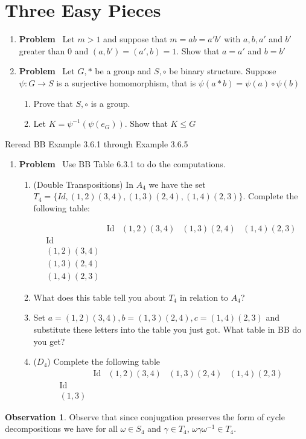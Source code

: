 \documentclass[12pt]{amsart}
\newcommand{\benu}{\begin{enumerate}}
\newcommand{\eenu}{\end{enumerate}}
\theoremstyle{definition}
\newtheorem{observation}[theorem]{Observation}
\newcommand{\bo}{\begin{observation}}
\newcommand{\eo}{\end{observation}}
\DeclareMathOperator{\Id}{Id}
\newcommand{\itep}{\item {\bfseries Problem}\ }
\begin{document}
\section{Three Easy Pieces}
\begin{enumerate}[series=p]
\itep 
\label{drp}Let $m>1$ and suppose that $m=ab=a'b'$ with $a,b,a'$ and $b'$ greater than $0$ and $(a,b')=(a',b)=1$. Show that  $a=a'$ and $b=b'$
\itep
Let $G,\ast$ be a group and $S,\circ$ be binary structure. Suppose $\psi\colon G\to S$ is a surjective homomorphism, that is $\psi(a\ast b)=\psi(a)\circ\psi(b)$
\benu
\item Prove that $S,\circ$ is a group.
\item Let $K=\psi^{-1}(\psi(e_G))$. Show that $K\leq G$
\eenu
\end{enumerate}
Reread BB Example 3.6.1 through Example 3.6.5
\begin{enumerate}[resume=p]
\itep \label{D4comp} Use BB Table 6.3.1 to do the computations.
\benu
\item (Double Transpositions) \label{dt} In $A_4$ we have the set $T_4=\{Id,(1,2)(3,4),(1,3)(2,4),(1,4)(2,3)\}$. Complete the following table:

\begin{equation*}
\begin{array}{c|c|c|c|c}
	& \Id	&(1,2)(3,4)&(1,3)(2,4)&(1,4)(2,3)\\
\hline
\Id	&	&	&	&\\
\hline
(1,2)(3,4)	&	&	&	&\\
\hline
(1,3)(2,4)&	&	&	&\\
\hline	
(1,4)(2,3)&	&	&	&
\end{array}				
\end{equation*}
\item What does this table tell you about $T_4$ in relation to $A_4$?
\item Set $a=(1,2)(3,4),b=(1,3)(2,4),c=(1,4)(2,3)$ and substitute these letters into the table you just got. What table in BB do you get?
\item ($D_4$) Complete the following table
\begin{equation*} 
\begin{array}{c|c|c|c|c}
	&\Id	&(1,2)(3,4)	&(1,3)(2,4)	&(1,4)(2,3)	 \\
\hline	
	\Id&	&	&	&	\\
\hline	
	(1,3)&	&	&	&
\end{array}
\end{equation*}

\eenu
\end{enumerate}
\bo Observe that since conjugation preserves the form of cycle decompositions we have for all $\omega\in S_4$ and $\gamma\in T_4$, $\omega\gamma\omega^{-1}\in T_4$.
\eo
\end{document}
